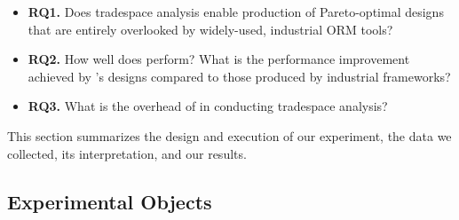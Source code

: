 \documentclass{sig-alternate}
\begin{document}
\begin{itemize}
\item \textbf{RQ1.} Does \@approach tradespace analysis enable production of Pareto-optimal designs that are entirely overlooked by widely-used, industrial ORM tools? 
\item \textbf{RQ2.} How well does \@approach perform? What is the performance improvement achieved by \@approach's designs compared to those produced by industrial frameworks? 
\item \textbf{RQ3.} What is the overhead of \@approach in conducting tradespace analysis? 



\end{itemize}



This section summarizes the design and execution of our experiment, the data we collected, its interpretation, and our results. %



\subsection{Experimental Objects}
\end{document}

